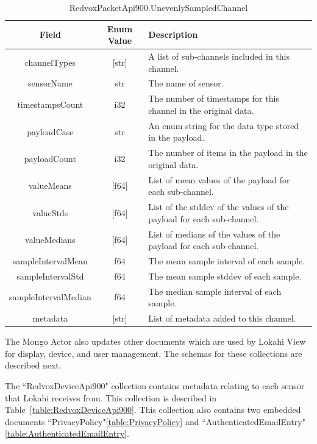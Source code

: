 \begin{table}[H]
	\centering
	\caption{RedvoxPacketApi900.UnevenlySampledChannel}
	\begin{tabular}{|c|c| p{8cm} |}
		\hline
		Field & Enum Value & Description  \\
		\hline
		channelTypes & [str] & A list of sub-channels included in this channel. \\
		\hline
		sensorName & str & The name of sensor. \\
		\hline
		timestampsCount & i32 & The number of timestamps for this channel in the original data. \\
		\hline
		payloadCase & str & An enum string for the data type stored in the payload. \\
		\hline
		payloadCount & i32 & The number of items in the payload in the original data. \\
		\hline
		valueMeans & [f64] & List of mean values of the payload for each sub-channel. \\
		\hline
		valueStds & [f64] & List of the stddev of the values of the payload for each sub-channel. \\
		\hline
		valueMedians & [f64] & List of medians of the values of the payload for each sub-channel. \\
		\hline
		sampleIntervalMean & f64 & The mean sample interval of each sample. \\
		\hline
		sampleIntervalStd & f64 & The mean sample stddev of each sample. \\
		\hline
		sampleIntervalMedian & f64 & The median sample interval of each sample. \\
		\hline
		metadata & [str] & List of metadata added to this channel. \\
		\hline
	\end{tabular}
	\label{table:UnevenlySampledChannel}
\end{table}

The Mongo Actor also updates other documents which are used by Lokahi View for display, device, and user management. The schemas for these collections are described next.

The ``RedvoxDeviceApi900" collection contains metadata relating to each sensor that Lokahi receives from. This collection is described in Table~\ref{table:RedvoxDeviceApi900}. This collection also contains two embedded documents ``PrivacyPolicy"\ref{table:PrivacyPolicy} and ``AuthenticatedEmailEntry"\ref{table:AuthenticatedEmailEntry}.

